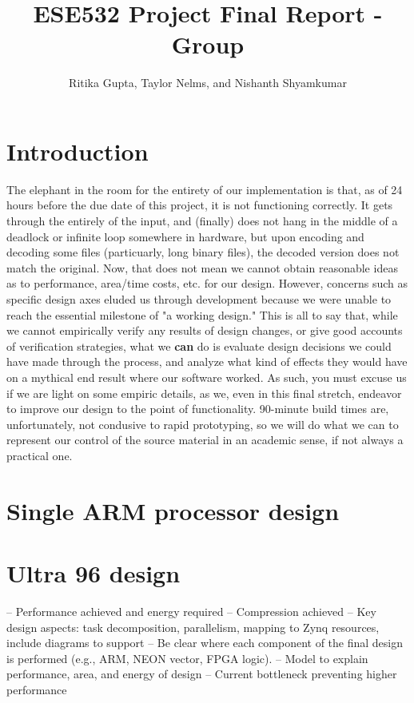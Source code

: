 \documentclass{article}
\title{ESE532 Project Final Report - Group}
\author{Ritika Gupta, Taylor Nelms, and Nishanth Shyamkumar}
\begin{document}
\maketitle

\section{Introduction}
The elephant in the room for the entirety of our implementation is that, as of 24 hours before the due date of this project, it is not functioning correctly.
It gets through the entirely of the input, and (finally) does not hang in the middle of a deadlock or infinite loop somewhere in hardware, but upon encoding and decoding some files (particuarly, long binary files), the decoded version does not match the original.
\newline\newline
Now, that does not mean we cannot obtain reasonable ideas as to performance, area/time costs, etc. for our design. However, concerns such as specific design axes eluded us through development because we were unable to reach the essential milestone of "a working design."
\newline\newline
This is all to say that, while we cannot empirically verify any results of design changes, or give good accounts of verification strategies, what we \textbf{can} do is evaluate design decisions we could have made through the process, and analyze what kind of effects they would have on a mythical end result where our software worked.
\newline\newline
As such, you must excuse us if we are light on some empiric details, as we, even in this final stretch, endeavor to improve our design to the point of functionality. 90-minute build times are, unfortunately, not condusive to rapid prototyping, so we will do what we can to represent our control of the source material in an academic sense, if not always a practical one.

\section{Single ARM processor design}



\section{Ultra 96 design}
– Performance achieved and energy required
– Compression achieved
– Key design aspects: task decomposition, parallelism, mapping to Zynq resources, include diagrams to support
– Be clear where each component of the final design is performed (e.g., ARM, NEON vector, FPGA logic).
– Model to explain performance, area, and energy of design
– Current bottleneck preventing higher performance
\end{document}

